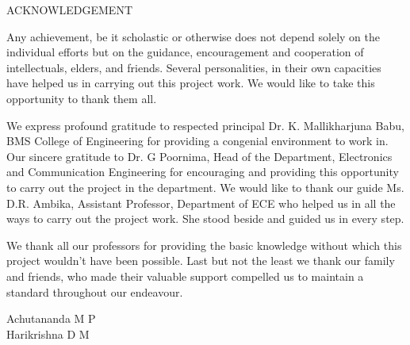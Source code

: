 {\fontsize{16pt}{19.2pt}\selectfont\bf{\begin{center}
ACKNOWLEDGEMENT
\end{center}}}

\vspace*{1cm}

Any achievement, be it scholastic or otherwise does not depend solely on the individual efforts but on the guidance, encouragement and cooperation of intellectuals, elders, and friends. Several personalities, in their own capacities have helped us in carrying out this project work. We would like to take this opportunity to thank them all.

We express profound gratitude to respected principal Dr. K. Mallikharjuna Babu, BMS College of Engineering for providing a congenial environment to work in. Our sincere gratitude to Dr. G Poornima, Head of the Department, Electronics and Communication Engineering for encouraging and providing this opportunity to carry out the project in the department.
We would like to thank our guide Ms. D.R. Ambika, Assistant Professor, Department of ECE who helped us in all the ways to carry out the project work. She stood beside and guided us in every step. 

We thank all our professors for providing the basic knowledge without which this project wouldn't have been possible. Last but not the least we thank our family and friends, who made their valuable support compelled us to maintain a standard throughout our endeavour.

\vspace*{1cm}

\begin{flushleft}
Achutananda M P \\
Harikrishna D M 
\end{flushleft}
